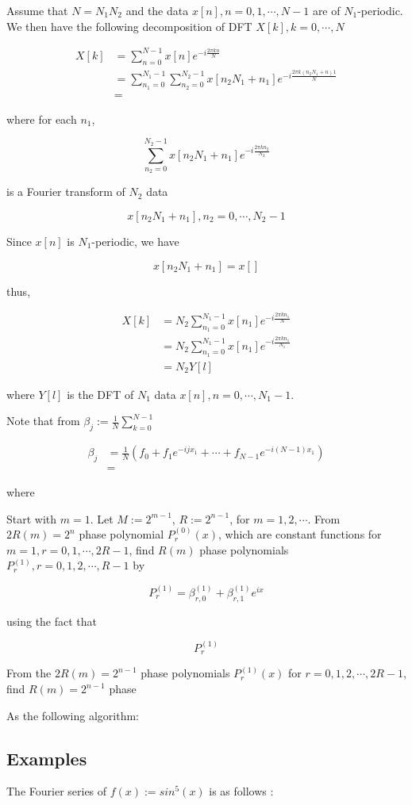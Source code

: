 \documentclass[12pt]{article}
\theoremstyle{nonumberbreak}
\begin{document}
Assume that $N=N_1N_2$ and the data $x[n], n=0,1,\cdots,N-1$ are of $N_1$-periodic. We then have the following decomposition of DFT $X[k], k=0,\cdots,N$

$$
\begin{aligned}
X[k] &= \sum_{n=0}^{N-1} x[n] e^{-i\frac{2\pi kn}{N}} \\[8pt]
&= \sum_{n_1=0}^{N_1-1} \sum_{n_2=0}^{N_2-1} x[n_2 N_1 + n_1] e^{-i \frac{2\pi k (n_2 N_1 + n)1 }{N}} \\[8pt]
&= 
\end{aligned}
$$

where for each $n_1$,

$$
\sum_{n_2=0}^{N_2-1} x[n_2 N_1 + n_1] e^{-i \frac{2\pi kn_2}{N_2}}
$$

is a Fourier transform of $N_2$ data

$$
x[n_2 N_1 + n_1], n_2 = 0,\cdots, N_2 -1
$$

Since $x[n]$ is $N_1$-periodic, we have

$$
x[n_2 N_1 + n_1] = x[]
$$

thus,


$$
\begin{aligned}
X[k] &= N_2 \sum_{n_1=0}^{N_1 -1} x[n_1] e^{-i\frac{2\pi k n_1}{N}} \\[8pt]
&= N_2 \sum_{n_1=0}^{N_1-1} x[n_1] e^{-i \frac{2\pi k n_1}{N_1}} \\[8pt]
&= N_2 Y[l]
\end{aligned}
$$

where $Y[l]$ is the DFT of $N_1$ data $x[n], n=0,\cdots,N_1-1$. 



Note that from $\beta_j := \frac{1}{N} \sum_{k=0}^{N-1}$

$$
\begin{aligned}
\beta_j &= \frac{1}{N} \left( f_0 + f_1 e^{-ijx_1} + \cdots + f_{N-1} e^{-i(N-1)x_1} \right) \\[8pt]
&= 
\end{aligned}
$$

where


Start with $m=1$. Let $M:= 2^{m-1}$, $R:= 2^{n-1}$, for $m=1,2,\cdots$. From $2R(m) = 2^n$ phase polynomial $P_r^{(0)}(x)$, which are constant functions for $m=1, r=0,1,\cdots,2R-1$, find $R(m)$ phase polynomials $P_r^{(1)}, r=0,1,2,\cdots,R-1$ by

$$
P_r^{(1)} = \beta_{r,0}^{(1)} + \beta_{r,1}^{(1)} e^{ix}
$$

using the fact that 

$$
P_r^{(1)}
$$


From the $2R(m) = 2^{n-1}$ phase polynomials $P_r^{(1)} (x)$ for $r=0,1,2,\cdots,2R-1$, find $R(m) = 2^{n-1}$ phase 









As the following algorithm: 


\subsection*{Examples}


The Fourier series of $f(x):= sin^5(x)$ is as follows :
\end{document}
